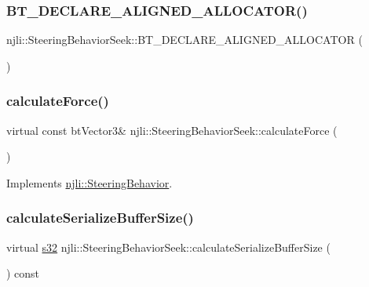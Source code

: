 \subsubsection{\texorpdfstring{B\+T\+\_\+\+D\+E\+C\+L\+A\+R\+E\+\_\+\+A\+L\+I\+G\+N\+E\+D\+\_\+\+A\+L\+L\+O\+C\+A\+T\+O\+R()}{BT\_DECLARE\_ALIGNED\_ALLOCATOR()}}
{\footnotesize\ttfamily njli\+::\+Steering\+Behavior\+Seek\+::\+B\+T\+\_\+\+D\+E\+C\+L\+A\+R\+E\+\_\+\+A\+L\+I\+G\+N\+E\+D\+\_\+\+A\+L\+L\+O\+C\+A\+T\+OR (\begin{DoxyParamCaption}{ }\end{DoxyParamCaption})\hspace{0.3cm}{\ttfamily [protected]}}

\mbox{\label{classnjli_1_1_steering_behavior_seek_a513e5b0f1e677cae6af2446485a80c61}} 
\subsubsection{\texorpdfstring{calculate\+Force()}{calculateForce()}}
{\footnotesize\ttfamily virtual const bt\+Vector3\& njli\+::\+Steering\+Behavior\+Seek\+::calculate\+Force (\begin{DoxyParamCaption}{ }\end{DoxyParamCaption})\hspace{0.3cm}{\ttfamily [virtual]}}



Implements \mbox{\hyperlink{classnjli_1_1_steering_behavior_a9720953de1268f658636213946d76ed3}{njli\+::\+Steering\+Behavior}}.

\mbox{\label{classnjli_1_1_steering_behavior_seek_aecc44b5c250eae468afe04cfbccf73a6}} 
\subsubsection{\texorpdfstring{calculate\+Serialize\+Buffer\+Size()}{calculateSerializeBufferSize()}}
{\footnotesize\ttfamily virtual \mbox{\hyperlink{_util_8h_aa62c75d314a0d1f37f79c4b73b2292e2}{s32}} njli\+::\+Steering\+Behavior\+Seek\+::calculate\+Serialize\+Buffer\+Size (\begin{DoxyParamCaption}{ }\end{DoxyParamCaption}) const\hspace{0.3cm}{\ttfamily [virtual]}}

